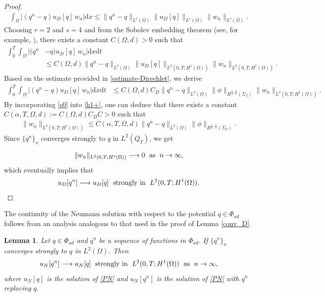 \documentclass[a4paper,12pt,reqno,natbib]{amsart}
\newtheorem{lemma}[theorem]{Lemma}
\newcommand{\dx} {\displaystyle\mathrm{d}x}
\newcommand{\dt} {\displaystyle\mathrm{d}t}
\begin{document}
\begin{proof}
\begin{align*} 
\int_\Omega \Big|(q^n -q) u_D[q]\, w_n\Big|\dx\leq  \|q^n -q\|_{L^{r}(\Omega)}\| u_D[q]\|_{L^{s}(\Omega)}\|w_n\|_{L^{s}(\Omega)}.
\end{align*}
Choosing $r=2$ and $s=4$ and from the Sobolev embedding theorem (see, for example, \cite{brezis2010functional}), there exists a constant $C(\Omega,d)>0$ such that
\begin{align} \label{h11}
\int_0^T\int_\Omega\Big|(q^n &-q) u_D[q]\, w_n\Big|\dx\dt\nonumber\\&\leq C(\Omega,d)
\|q^n -q\|_{L^2(\Omega)}\| u_D[q]\|_{L^2(0,T;H^1(\Omega))}\|w_n\|_{L^2(0,T;H^1(\Omega))}.
\end{align}
Based on the estimate provided in \eqref{estimate-Direchlet}, we derive
\begin{align} \label{s0}
\int_0^T\int_\Omega\Big|(q^n -q) u_D[q]\, w_n\Big|\dx\dt&\leq C(\Omega,d)C_D
\|q^n -q\|_{L^2(\Omega)}\|\phi\|_{H^{\frac{1}{2}, \frac{\alpha}{4} }(\Sigma_T)}\|w_n\|_{L^2(0,T;H^1(\Omega))}.
\end{align}
By incorporating \eqref{s0} into \eqref{h1+}, one can deduce that there exists a constant $C(\alpha,T,\Omega,d):=C(\Omega,d)C_D C>0$ such that
\begin{align*}
  \|w_n\|_{L^2(0,T;H^1(\Omega))}\leq   C(\alpha,T,\Omega,d)
\|q^n -q\|_{L^2(\Omega)}\|\phi\|_{H^{\frac{1}{2}, \frac{\alpha}{4} }(\Sigma_T)}.
\end{align*}
Since  $\{ q^n \}_n$ converges strongly to  $q$ in $L^2(Q_T)$, we get

\begin{align*} %
   \|w_n\|_{L^2(0,T;H^1(\Omega))} \longrightarrow 0\; \hbox{ as }\; n\to \infty,
\end{align*} which eventually implies that
\begin{align*}
    u_D[q^n]\longrightarrow u_D[q]\; \hbox{ strongly in } \; L^2(0,T;H^1(\Omega)).
\end{align*}
\end{proof}

The continuity of the Neumann solution with respect to the potential $q\in\Phi_{ad}$ follows from an analysis analogous to that used in the proof of Lemma \ref{conv_D}.

\begin{lemma} \label{conv_N}
Let $q\in\Phi_{ad}$ and $q^n$ be a sequence of functions in $\Phi_{ad}.$ If $\{ q^n \}_n$ converges strongly to  $q$ in $L^2(\Omega)$. Then
\begin{equation} \label{convergancefaible-N}
    u_N[q^n]\longrightarrow u_N[q]\; \hbox{ strongly in }\; L^2(0,T;H^1(\Omega))\; \hbox{ as }\; n\to\infty, 
\end{equation}
where $u_N[q]$ is the solution of \eqref{PN} and $u_N[q^n]$ is the solution of \eqref{PN} with $q^n$ replacing $q$.
\end{lemma}
\end{document}
